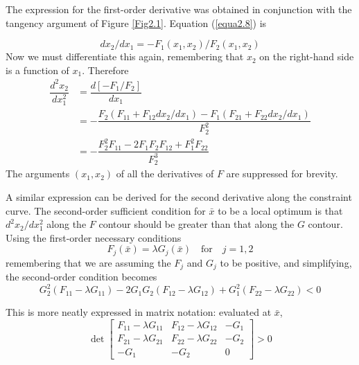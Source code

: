 The expression for the first-order derivative was obtained in conjunction with the tangency argument of Figure \ref{Fig2.1}. Equation (\ref{equa2.8}) is 

\begin{equation*}
d x_2 / d x_1 = - F_1 (x_1, x_2) / F_2 (x_1, x_2)
\end{equation*}
Now we must differentiate this again, remembering that $x_2$ on the right-hand side is a function of $x_1$. Therefore
\begin{equation*}
\begin{array}{rl}
 \dfrac{d^2 x_2}{d x_1^2} & = \dfrac{d [-F_1/F_2]}{dx_1} \\
         & = - \dfrac{ F_2 ( F_{11} + F_{12} dx_2/dx_1 ) - F_1(F_{21}+F_{22} dx_2/dx_1)}{F_2^2} \\
         & = - \dfrac{ F_2^2 F_{11} - 2 F_1 F_2 F_{12} + F_1^2 F_{22}}{ F_2^3 }
\end{array}
\end{equation*}
The arguments $(x_1, x_2)$ of all the derivatives of $F$ are suppressed for brevity.

A similar expression can be derived for the second derivative along the constraint curve. The second-order sufficient condition for $\bar{x}$ to be a local optimum is that $d^2 x_2 / d x_1^2$ along the $F$ contour should be greater than that along the $G$ contour. Using the first-order necessary conditions
\begin{equation*}
F_j(\bar{x}) = \lambda G_j (\bar{x}) \quad \mbox{for} \quad j=1,2
\end{equation*}
remembering that we are assuming the $F_j$ and $G_j$ to be positive, and simplifying, the second-order condition becomes
\begin{equation} \label{equa8.10}
G_2^2(F_{11} - \lambda G_{11} ) - 2 G_1 G_2 (F_{12} - \lambda G_{12}) + G_1^2 (F_{22}-\lambda G_{22}) < 0
\end{equation}

This is more neatly expressed in matrix notation: evaluated at $\bar{x}$,
\begin{equation} \label{equa8.11}
\det \left[
\begin{array}{ccc}
F_{11} -\lambda G_{11} &  F_{12}-\lambda G_{12} & -G_1 \\
F_{21} -\lambda G_{21} &  F_{22}-\lambda G_{22} & -G_2 \\
-G_1  & -G_2 & 0
\end{array}
\right] > 0
\end{equation}

